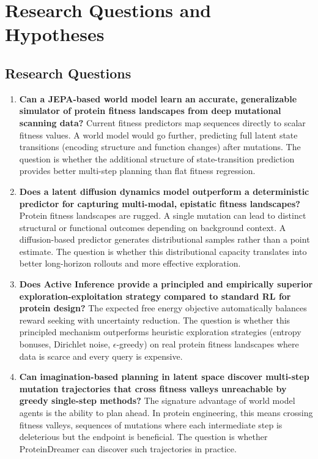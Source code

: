 \documentclass[12pt, a4paper]{article}
\begin{document}
\section{Research Questions and Hypotheses}
\label{sec:research_questions}

\subsection{Research Questions}

\begin{enumerate}
    \item \textbf{Can a JEPA-based world model learn an accurate, generalizable simulator of protein fitness landscapes from deep mutational scanning data?} Current fitness predictors map sequences directly to scalar fitness values. A world model would go further, predicting full latent state transitions (encoding structure and function changes) after mutations. The question is whether the additional structure of state-transition prediction provides better multi-step planning than flat fitness regression.

    \item \textbf{Does a latent diffusion dynamics model outperform a deterministic predictor for capturing multi-modal, epistatic fitness landscapes?} Protein fitness landscapes are rugged. A single mutation can lead to distinct structural or functional outcomes depending on background context. A diffusion-based predictor generates distributional samples rather than a point estimate. The question is whether this distributional capacity translates into better long-horizon rollouts and more effective exploration.

    \item \textbf{Does Active Inference provide a principled and empirically superior exploration-exploitation strategy compared to standard RL for protein design?} The expected free energy objective automatically balances reward seeking with uncertainty reduction. The question is whether this principled mechanism outperforms heuristic exploration strategies (entropy bonuses, Dirichlet noise, $\epsilon$-greedy) on real protein fitness landscapes where data is scarce and every query is expensive.

    \item \textbf{Can imagination-based planning in latent space discover multi-step mutation trajectories that cross fitness valleys unreachable by greedy single-step methods?} The signature advantage of world model agents is the ability to plan ahead. In protein engineering, this means crossing fitness valleys, sequences of mutations where each intermediate step is deleterious but the endpoint is beneficial. The question is whether ProteinDreamer can discover such trajectories in practice.
\end{enumerate}
\end{document}
